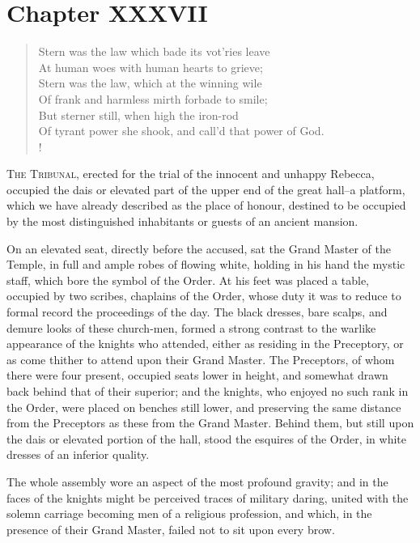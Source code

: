 \chapter{Chapter XXXVII}

\begin{verse}
Stern was the law which bade its vot'ries leave\\
At human woes with human hearts to grieve;\\
Stern was the law, which at the winning wile\\
Of frank and harmless mirth forbade to smile;\\
But sterner still, when high the iron-rod\\
Of tyrant power she shook, and call'd that power of God.\\!
\end{verse}

\lettrine{T}{he Tribunal}, erected for the trial of the innocent and
unhappy Rebecca,
occupied the dais or elevated part of the upper end of the great hall--a
platform, which we have already described as the place of honour,
destined to be occupied by the most distinguished inhabitants or guests
of an ancient mansion.

On an elevated seat, directly before the accused, sat the Grand Master
of the Temple, in full and ample robes of flowing white, holding in his
hand the mystic staff, which bore the symbol of the Order. At his feet
was placed a table, occupied by two scribes, chaplains of the Order,
whose duty it was to reduce to formal record the proceedings of the day.
The black dresses, bare scalps, and demure looks of these church-men,
formed a strong contrast to the warlike appearance of the knights who
attended, either as residing in the Preceptory, or as come thither to
attend upon their Grand Master. The Preceptors, of whom there were four
present, occupied seats lower in height, and somewhat drawn back behind
that of their superior; and the knights, who enjoyed no such rank in the
Order, were placed on benches still lower, and preserving the same
distance from the Preceptors as these from the Grand Master. Behind
them, but still upon the dais or elevated portion of the hall, stood the
esquires of the Order, in white dresses of an inferior quality.

The whole assembly wore an aspect of the most profound gravity; and in
the faces of the knights might be perceived traces of military daring,
united with the solemn carriage becoming men of a religious profession,
and which, in the presence of their Grand Master, failed not to sit upon
every brow.


